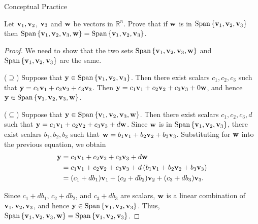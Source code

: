 \documentclass[xcolor=dvipsnames,aspectratio=169,t]{beamer}
\begin{document}
\begin{frame}{Conceptual Practice}

Let $\mathbf{v}_1, \mathbf{v}_2$, $\mathbf{v}_3$ and $\mathbf{w}$ be vectors in $\mathbb{R}^n$.
Prove that if  $\mathbf{w}$ is in $\mbox{Span} \left\{ \mathbf{v}_1, \mathbf{v}_2, \mathbf{v}_3  \right\}$ then $\mbox{Span} \left\{ \mathbf{v}_1, \mathbf{v}_2 , \mathbf{v}_3 , \mathbf{w} \right\} = \mbox{Span} \left\{ \mathbf{v}_1, \mathbf{v}_2 , \mathbf{v}_3 \right\}$.

\begin{proof}
\pause
We need to show that the two sets $\mbox{Span} \left\{ \mathbf{v}_1, \mathbf{v}_2 , \mathbf{v}_3 , \mathbf{w} \right\}$ and $\mbox{Span} \left\{ \mathbf{v}_1, \mathbf{v}_2 , \mathbf{v}_3 \right\}$ are the same.

($\supseteq$)
Suppose that $\mathbf{y}\in \mbox{Span} \left\{ \mathbf{v}_1, \mathbf{v}_2 , \mathbf{v}_3 \right\}$.
Then there exist scalars $c_1, c_2, c_3$ such that $\mathbf{y}=c_1 \mathbf{v}_1 + c_2 \mathbf{v}_2 + c_3 \mathbf{v}_3$.
Then $\mathbf{y}=c_1 \mathbf{v}_1 + c_2 \mathbf{v}_2 + c_3 \mathbf{v}_3 + 0 \mathbf{w}$, and hence $\mathbf{y}\in \mbox{Span} \left\{ \mathbf{v}_1, \mathbf{v}_2 , \mathbf{v}_3 , \mathbf{w} \right\}$.

\pause
($\subseteq$)
Suppose that $\mathbf{y}\in \mbox{Span} \left\{ \mathbf{v}_1, \mathbf{v}_2 , \mathbf{v}_3 , \mathbf{w} \right\}$.
Then there exist scalars $c_1, c_2, c_3, d$ such that $\mathbf{y}=c_1 \mathbf{v}_1 + c_2 \mathbf{v}_2 + c_3 \mathbf{v}_3 + d \mathbf{w}$.
Since $\mathbf{w}$ is in $\mbox{Span} \left\{ \mathbf{v}_1, \mathbf{v}_2, \mathbf{v}_3  \right\}$,
there exist scalars $b_1,b_2,b_3$ such that $\mathbf{w}=b_1 \mathbf{v}_1 + b_2 \mathbf{v}_2 + b_3 \mathbf{v}_3$.
Substituting for $\mathbf{w}$ into the previous equation, we obtain
\vspace*{-1em}\begin{align*}
  \mathbf{y}&=c_1 \mathbf{v}_1 + c_2 \mathbf{v}_2 + c_3 \mathbf{v}_3 + d \mathbf{w} \\
         &=c_1 \mathbf{v}_1 + c_2 \mathbf{v}_2 + c_3 \mathbf{v}_3 + d \left( b_1 \mathbf{v}_1 + b_2 \mathbf{v}_2 + b_3 \mathbf{v}_3\right) \\
         &= (c_1+db_1) \mathbf{v}_1 + (c_2+db_2) \mathbf{v}_2 + (c_3+db_3) \mathbf{v}_3 .
\end{align*}

\vspace*{-1em}
Since $c_1+db_1$, $c_2+db_2$, and $c_3+db_3$ are scalars, $\mathbf{w}$ is a linear combination of $\mathbf{v}_1, \mathbf{v}_2 , \mathbf{v}_3$, and hence $\mathbf{y}\in \mbox{Span} \left\{ \mathbf{v}_1, \mathbf{v}_2 , \mathbf{v}_3 \right\}$.
Thus, $\mbox{Span} \left\{ \mathbf{v}_1, \mathbf{v}_2 , \mathbf{v}_3 , \mathbf{w} \right\} = \mbox{Span} \left\{ \mathbf{v}_1, \mathbf{v}_2 , \mathbf{v}_3 \right\}$.
\end{proof}

\vspace{3in}

\end{frame}
\end{document}
